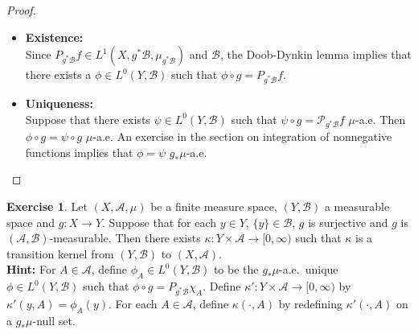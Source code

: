 \documentclass{book}
\theoremstyle{definition}
\newtheorem{ex}[definition]{Exercise}
\newcommand{\kap}{\kappa}
\newcommand{\MA}{\mathcal{A}}
\newcommand{\MB}{\mathcal{B}}
\newcommand{\MP}{\mathcal{P}}
\DeclareMathOperator*{\0}{\mbf{0}}
\DeclareMathOperator*{\1}{\mbf{1}}
\newcommand{\Rg}{[0,\infty)}
\begin{document}
	\begin{proof}\
		\begin{itemize}
			\item \textbf{Existence:} \\
			Since $P_{g^*\MB}f \in L^1(X, g^*\MB, \mu_{g^*\MB})$ and $\MB$, the Doob-Dynkin lemma implies that there exists a $\phi \in L^0(Y, \MB)$ such that $\phi \circ g = P_{g^*\MB}f$.
			\item \textbf{Uniqueness:} \\
			Suppose that there exists $\psi \in L^0(Y, \MB)$ such that $\psi \circ g = \MP_{g^*\MB}f$ $\mu$-a.e. Then $\phi \circ g = \psi \circ g$ $\mu$-a.e. An exercise in the section on integration of nonnegative functions implies that $\phi = \psi$ $g_*\mu$-a.e.
		\end{itemize} 
	\end{proof}
	
	\begin{ex}
		Let $(X, \MA, \mu)$ be a finite measure space, $(Y, \MB)$ a measurable space and $g: X \rightarrow Y$. Suppose that for each $y \in Y$, $\{y\} \in \MB$, $g$ is surjective and $g$ is $(\MA, \MB)$-measurable. Then there exists $\kap: Y \times \MA \rightarrow \Rg$ such that $\kap$ is a transition kernel from $(Y, \MB)$ to $(X, \MA)$.\\
		\textbf{Hint:} For $A \in \MA$, define $\phi_A \in L^0(Y, \MB )$ to be the $g_*\mu$-a.e.\ unique $\phi \in L^0(Y, \MB)$ such that $\phi \circ g = P_{g^*\MB} \chi_A$. Define $\kap': Y \times \MA \rightarrow \Rg$ by $\kap'(y, A) = \phi_A(y)$. For each $A \in \MA$, define $\kap(\cdot, A)$ by redefining $\kap'(\cdot, A)$ on a $g_*\mu$-null set.
	\end{ex}
	
\end{document}
